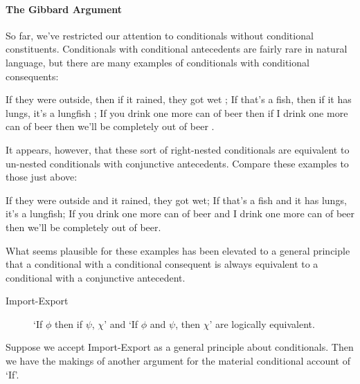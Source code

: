 \paragraph{The Gibbard Argument}
 So far, we've restricted our attention to conditionals without conditional constituents. Conditionals with conditional antecedents are fairly rare in natural language, but there are many examples of conditionals with conditional consequents: \begin{exe}
 	\ex  \begin{xlist}
 		\ex If they were outside, then if it rained, they got wet \citep[§2.5]{edgington};
 	\ex If that's a fish, then if it has lungs, it's a lungfish \citep{mcgee};
 	\ex If you drink one more can of beer then if I drink one more can of beer then we’ll be completely out of beer \citep[88]{kratzer}.
 	\end{xlist}
 \end{exe} 
It appears, however, that these sort of right-nested conditionals are equivalent to un-nested conditionals with conjunctive antecedents. Compare these examples to those just above:
\begin{exe}
 	\ex  \begin{xlist}
 		\ex If they were outside and it rained, they got wet; 
 	\ex If that's a fish and it has lungs, it's a lungfish;
 	\ex If you drink one more can of beer and I drink one more can of beer then we’ll be completely out of beer.
 	\end{xlist}
 \end{exe} 
What seems plausible for these examples has been elevated to a general principle that a conditional with a conditional consequent is always equivalent to a conditional with a conjunctive antecedent. \begin{description}
	\item[Import-Export] `If $\phi$ then if $\psi$, $\chi$' and `If $\phi$ and $\psi$, then $\chi$' are logically equivalent.
\end{description}
Suppose we accept Import-Export as a general principle about conditionals. Then we have the makings of another argument for the material conditional account of `If'.

